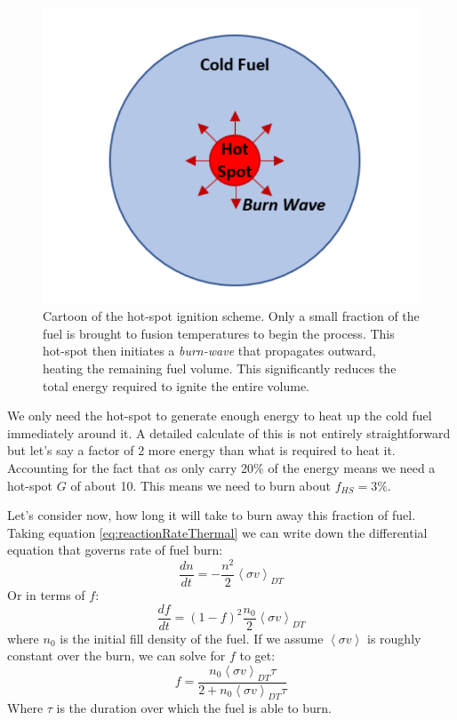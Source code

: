 \begin{figure}[h!]
	\centering
	\includegraphics[scale=0.5]{Figures/hotspot.pdf}
	\caption[Hot Spot Ignition Scheme]{Cartoon of the hot-spot ignition scheme. Only a small fraction of the fuel is brought to fusion temperatures to begin the process. This hot-spot then initiates a \emph{burn-wave} that propagates outward, heating the remaining fuel volume. This significantly reduces the total energy required to ignite the entire volume.}
	\label{fig:hotspot}
\end{figure}

We only need the hot-spot to generate enough energy to heat up the cold fuel immediately around it. A detailed calculate of this is not entirely straightforward but let's say a factor of 2 more energy than what is required to heat it. Accounting for the fact that $\alpha$s only carry 20\% of the energy means we need a hot-spot $G$ of about 10. This means we need to burn about $f_{HS}=3\%$. 

Let's consider now, how long it will take to burn away this fraction of fuel. Taking equation \ref{eq:reactionRateThermal} we can write down the differential equation that governs rate of fuel burn:
%
\begin{equation}
	\dfrac{dn}{dt} = - \frac{n^2}{2}\left<\sigma v\right>_{DT}
\end{equation}
%
Or in terms of $f$:
%
\begin{equation}
	\frac{df}{dt} = (1-f)^2\frac{n_0}{2}\left<\sigma v\right>_{DT}
\end{equation}
%
where $n_0$ is the initial fill density of the fuel. If we assume $\left<\sigma v\right>$ is roughly constant over the burn, we can solve for $f$ to get:
%
\begin{equation}
	f = \frac{n_0\left<\sigma v\right>_{DT}\tau}{2 + n_0\left<\sigma v\right>_{DT} \tau}
	\label{eq:fuelFraction}
\end{equation}
%
Where $\tau$ is the duration over which the fuel is able to burn. 

